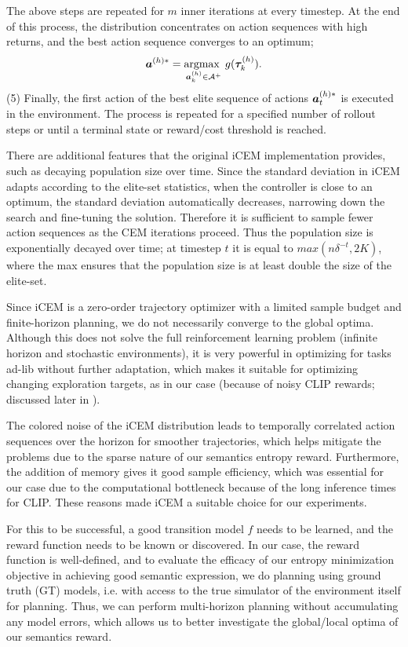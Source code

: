 The above steps are repeated for \(m\) inner iterations at every timestep.
At the end of this process, the distribution concentrates on action sequences with high returns, and the best action sequence converges to an optimum;
\begin{equation}
    \label{eq:planning-goal}
    \bm{a}^{(h)*} = \operatorname*{argmax~}_{\bm{a}^{(h)}_k \in \mathcal{A}^+} g(\bm{\tau}^{(h)}_k).
\end{equation}
(5) Finally, the first action of the best elite sequence of actions \(\bm{a}^{(h)*}_t\) is executed in the environment.
The process is repeated for a specified number of rollout steps or until a terminal state or reward/cost threshold is reached.

There are additional features that the original iCEM implementation provides, such as decaying population size over time. 
Since the standard deviation in iCEM adapts according to the elite-set statistics, when the controller is close to an optimum, the standard deviation automatically decreases, narrowing down the search and fine-tuning the solution.
Therefore it is sufficient to sample fewer action sequences as the CEM iterations proceed.
Thus the population size is exponentially decayed over time; at timestep \(t\) it is equal to \(max(n \delta^{-t}, 2K)\), where the max ensures that the population size is at least double the size of the elite-set.

Since iCEM is a zero-order trajectory optimizer with a limited sample budget and finite-horizon planning, we do not necessarily converge to the global optima.
Although this does not solve the full reinforcement learning problem (infinite horizon and stochastic environments), it is very powerful in optimizing for tasks ad-lib without further adaptation, which makes it suitable for optimizing changing exploration targets, as in our case (because of noisy CLIP rewards; discussed later in ).

The colored noise of the iCEM distribution leads to temporally correlated action sequences over the horizon for smoother trajectories, which helps mitigate the problems due to the sparse nature of our semantics entropy reward.
Furthermore, the addition of memory gives it good sample efficiency, which was essential for our case due to the computational bottleneck because of the long inference times for CLIP.
These reasons made iCEM a suitable choice for our experiments.

For this to be successful, a good transition model \(f\) needs to be learned, and the reward function needs to be known or discovered.
In our case, the reward function is well-defined, and to evaluate the efficacy of our entropy minimization objective in achieving good semantic expression,
we do planning using ground truth (GT) models, i.e. with access to the true simulator of the environment itself for planning.
Thus, we can perform multi-horizon planning without accumulating any model errors, which allows us to better investigate the global/local optima of our semantics reward. 

